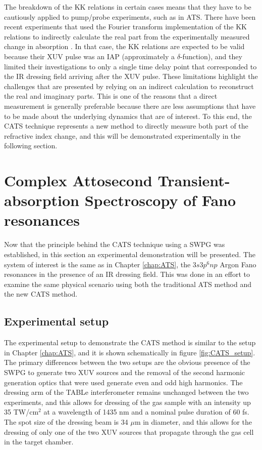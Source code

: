 The breakdown of the KK relations in certain cases means that they have to be cautiously applied to pump/probe experiments, such as in ATS.  There have been recent experiments that used the Fourier transform implementation of the KK relations \cite{petersonCausalityCalculationsTime1973} to indirectly calculate the real part from the experimentally measured change in absorption \cite{stoossRealTimeReconstructionStrongFieldDriven2018}.  In that case, the KK relations are expected to be valid because their XUV pulse was an IAP (approximately a $\delta$-function), and they limited their investigations to only a single time delay point that corresponded to the IR dressing field arriving after the XUV pulse.  These limitations highlight the challenges that are presented by relying on an indirect calculation to reconstruct the real and imaginary parts.  This is one of the reasons that a direct measurement is generally preferable because there are less assumptions that have to be made about the underlying dynamics that are of interest.  To this end, the CATS technique represents a new method to directly measure both part of the refractive index change, and this will be demonstrated experimentally in the following section.




\section{Complex Attosecond Transient-absorption Spectroscopy of Fano resonances}
\label{sec:CATS_ar}

Now that the principle behind the CATS technique using a SWPG was established, in this section an experimental demonstration will be presented.  The system of interest is the same as in Chapter \ref{chap:ATS}, the $3s3p^6np$ Argon Fano resonances in the presence of an IR dressing field. This was done in an effort to examine the same physical scenario using both the traditional ATS method and the new CATS method.

\subsection{Experimental setup}
\label{sec:CATS_ar_exp_setup}

The experimental setup to demonstrate the CATS method is similar to the setup in Chapter \ref{chap:ATS}, and it is shown schematically in figure \ref{fig:CATS_setup}.  The primary differences between the two setups are the obvious presence of the SWPG to generate two XUV sources and the removal of the second harmonic generation optics that were used generate even and odd  high harmonics.  The dressing arm of the TABLe interferometer remains unchanged between the two experiments, and this allows for dressing of the gas sample with an intensity up 35 TW/cm$^2$ at a wavelength of 1435 nm and a nominal pulse duration of 60 fs. The spot size of the dressing beam is 34 $\mu$m in diameter, and this allows for the dressing of only one of the two XUV sources that propagate through the gas cell in the target chamber.

